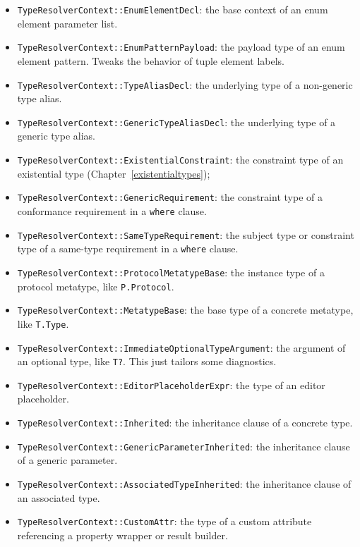 \documentclass[../generics]{subfiles}
\begin{document}
\begin{itemize}
\item \texttt{TypeResolverContext::EnumElementDecl}: the base context of an enum element parameter list.
\item \texttt{TypeResolverContext::EnumPatternPayload}: the payload type of an enum element pattern. Tweaks the behavior of tuple element labels.
\item \texttt{TypeResolverContext::TypeAliasDecl}: the underlying type of a non-generic type alias.
\item \texttt{TypeResolverContext::GenericTypeAliasDecl}: the underlying type of a generic type alias.
\item \texttt{TypeResolverContext::ExistentialConstraint}: the constraint type of an existential type (Chapter~\ref{existentialtypes});
\item \texttt{TypeResolverContext::GenericRequirement}: the constraint type of a conformance requirement in a \texttt{where} clause.
\item \texttt{TypeResolverContext::SameTypeRequirement}: the subject type or constraint type of a same-type requirement in a \texttt{where} clause.
\item \texttt{TypeResolverContext::ProtocolMetatypeBase}: the instance type of a protocol metatype, like \texttt{P.Protocol}.
\item \texttt{TypeResolverContext::MetatypeBase}: the base type of a concrete metatype, like \texttt{T.Type}.
\item \texttt{TypeResolverContext::ImmediateOptionalTypeArgument}: the argument of an optional type, like \texttt{T?}. This just tailors some diagnostics.
\item \texttt{TypeResolverContext::EditorPlaceholderExpr}: the type of an editor placeholder.
\item \texttt{TypeResolverContext::Inherited}: the inheritance clause of a concrete type.
\item \texttt{TypeResolverContext::GenericParameterInherited}: the inheritance clause of a generic parameter.
\item \texttt{TypeResolverContext::AssociatedTypeInherited}: the inheritance clause of an associated type.
\item \texttt{TypeResolverContext::CustomAttr}: the type of a custom attribute referencing a property wrapper or result builder.
\end{itemize}
\end{document}
